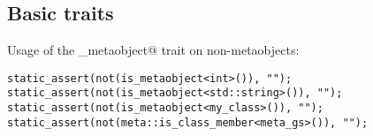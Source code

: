 \subsection{Basic traits}

Usage of the \verb@is_metaobject@ trait on non-metaobjects:

\begin{verbatim}
static_assert(not(is_metaobject<int>()), "");
static_assert(not(is_metaobject<std::string>()), "");
static_assert(not(is_metaobject<my_class>()), "");
static_assert(not(meta::is_class_member<meta_gs>()), "");
\end{verbatim}

